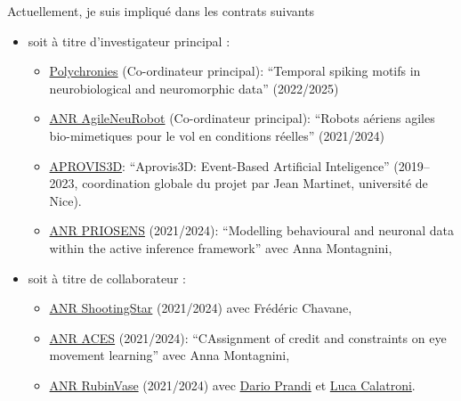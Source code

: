 \documentclass[10pt,french,a4paper,oneside]{article}%
\begin{document}
Actuellement, je suis impliqué dans les contrats suivants
\begin{itemize}
\item soit à titre d'investigateur principal :
\begin{itemize}
	\item  \href{https://laurentperrinet.github.io/grant/polychronies/}{Polychronies} (Co-ordinateur principal): ``Temporal spiking motifs in neurobiological and neuromorphic data'' (2022/2025)
	\item  \href{https://laurentperrinet.github.io/grant/anr-anr/}{ANR AgileNeuRobot} (Co-ordinateur principal): ``Robots aériens agiles bio-mimetiques pour le vol en conditions réelles'' (2021/2024)
	\item  \href{https://laurentperrinet.github.io/grant/aprovis-3-d/}{APROVIS3D}: ``Aprovis3D: Event-Based Artificial Inteligence'' (2019--2023, coordination globale du projet par Jean Martinet, université de Nice).
 	\item \href{https://laurentperrinet.github.io/grant/anr-priosens/}{ANR PRIOSENS} (2021/2024): ``Modelling behavioural and neuronal data within the active inference framework'' avec Anna Montagnini,
\end{itemize}
\item soit à titre de collaborateur :

\begin{itemize}
 \item \href{https://laurentperrinet.github.io/grant/anr-shootingstar/}{ANR ShootingStar} (2021/2024) avec Frédéric Chavane,
 \item \href{https://laurentperrinet.github.io/grant/anr-aces/}{ANR ACES} (2021/2024): ``CAssignment of credit and constraints on eye movement learning'' avec Anna Montagnini,
 \item \href{https://laurentperrinet.github.io/grant/anr-predicteye/}{ANR RubinVase} (2021/2024) avec \href{https://scholar.google.com/citations?user=22p8Wc4AAAAJ}{Dario Prandi} et \href{https://scholar.google.com/citations?user=dRVPKmkAAAAJ}{Luca Calatroni}.
\end{itemize}


\end{itemize}
\end{document}
